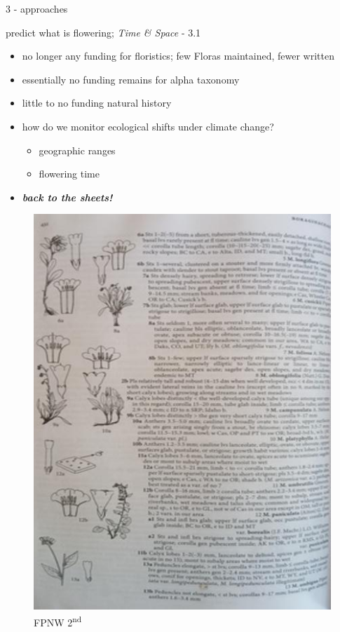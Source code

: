 \documentclass[
  ignorenonframetext,
]{beamer}
\providecommand{\tightlist}{%
  \setlength{\itemsep}{0pt}\setlength{\parskip}{0pt}}
\begin{document}
\begin{frame}{3 - approaches}
\protect\hypertarget{approaches}{}
\end{frame}

\begin{frame}{predict what is flowering; \emph{Time \& Space} - 3.1}
\protect\hypertarget{predict-what-is-flowering-time-space---3.1}{}
\begin{itemize}
\tightlist
\item
  no longer any funding for floristics; few Floras maintained, fewer
  written
\item
  essentially no funding remains for alpha taxonomy
\item
  little to no funding natural history
\item
  how do we monitor ecological shifts under climate change?

  \begin{itemize}
  \tightlist
  \item
    geographic ranges
  \item
    flowering time
  \end{itemize}
\item
  \textbf{\emph{back to the sheets!}}
\end{itemize}

\begin{figure}
\centering
\includegraphics[width=\textwidth,height=0.8\textheight]{../graphics/pictures/fpnw2.resized.jpg}
\caption{FPNW 2\textsuperscript{nd}}
\end{figure}
\end{frame}
\end{document}
